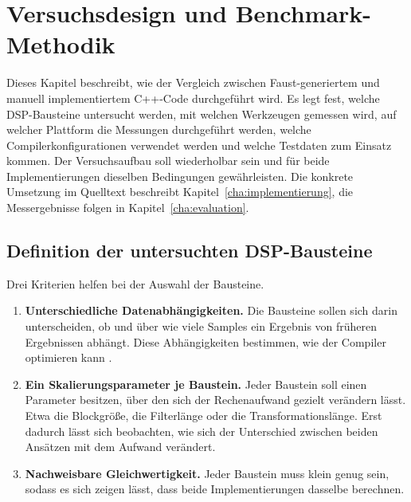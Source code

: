 \chapter{Versuchsdesign und Benchmark-Methodik}
\label{cha:versuchsdesign}

Dieses Kapitel beschreibt, wie der Vergleich zwischen Faust-generiertem und manuell implementiertem C++-Code durchgeführt wird. Es legt fest, welche DSP-Bausteine untersucht werden, mit welchen Werkzeugen gemessen wird, auf welcher Plattform die Messungen durchgeführt werden, welche Compilerkonfigurationen verwendet werden und welche Testdaten zum Einsatz kommen. Der Versuchsaufbau soll wiederholbar sein und für beide Implementierungen dieselben Bedingungen gewährleisten. Die konkrete Umsetzung im Quelltext beschreibt Kapitel~\ref{cha:implementierung}, die Messergebnisse folgen in Kapitel~\ref{cha:evaluation}.

\section{Definition der untersuchten DSP-Bausteine}
\label{sec:bausteine}

Drei Kriterien helfen bei der Auswahl der Bausteine.

\begin{enumerate}
	\item \textbf{Unterschiedliche Datenabhängigkeiten.} Die Bausteine sollen sich darin unterscheiden, ob und über wie viele Samples ein Ergebnis von früheren Ergebnissen abhängt. Diese Abhängigkeiten bestimmen, wie der Compiler optimieren kann \parencite{scaringella:hal-02158949}.
	\item \textbf{Ein Skalierungsparameter je Baustein.} Jeder Baustein soll einen Parameter besitzen, über den sich der Rechenaufwand gezielt verändern lässt. Etwa die Blockgröße, die Filterlänge oder die Transformationslänge. Erst dadurch lässt sich beobachten, wie sich der Unterschied zwischen beiden Ansätzen mit dem Aufwand verändert.
	\item \textbf{Nachweisbare Gleichwertigkeit.} Jeder Baustein muss klein genug sein, sodass es sich zeigen lässt, dass beide Implementierungen dasselbe berechnen.
\end{enumerate}

